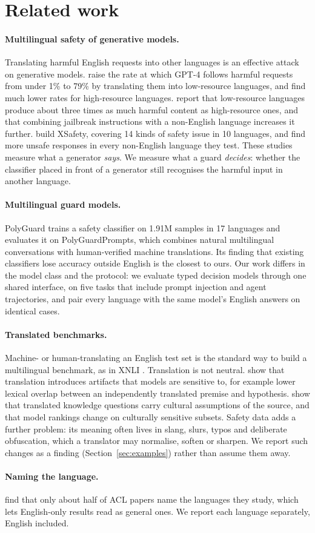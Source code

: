 \section{Related work}
\label{sec:related}

\paragraph{Multilingual safety of generative models.} Translating harmful
English requests into other languages is an effective attack on generative
models. \citet{yong2023lowresource} raise the rate at which GPT-4 follows
harmful requests from under 1\% to 79\% by translating them into low-resource
languages, and find much lower rates for high-resource languages.
\citet{deng2023multilingualjailbreak} report that low-resource languages
produce about three times as much harmful content as high-resource ones, and
that combining jailbreak instructions with a non-English language increases
it further. \citet{wang2023alllanguages} build XSafety, covering 14 kinds of
safety issue in 10 languages, and find more unsafe responses in every non-English
language they test. These studies measure what a generator \emph{says}. We
measure what a guard \emph{decides}: whether the classifier placed in front of a
generator still recognises the harmful input in another language.

\paragraph{Multilingual guard models.} PolyGuard \citep{kumar2025polyguard}
trains a safety classifier on 1.91M samples in 17 languages and evaluates it on
PolyGuardPrompts, which combines natural multilingual conversations with
human-verified machine translations. Its finding that existing classifiers
lose accuracy outside English is the closest to ours. Our work differs in the
model class and the protocol: we evaluate typed decision models through one
shared interface, on five tasks that include prompt injection and agent
trajectories, and pair every language with the same model's English answers on
identical cases.

\paragraph{Translated benchmarks.} Machine- or human-translating an English
test set is the standard way to build a multilingual benchmark, as in XNLI
\citep{conneau2018xnli}. Translation is not neutral.
\citet{artetxe2020translation} show that translation introduces artifacts that
models are sensitive to, for example lower lexical overlap between an
independently translated premise and hypothesis. \citet{singh2025globalmmlu}
show that translated knowledge questions carry cultural assumptions of the
source, and that model rankings change on culturally sensitive subsets. Safety
data adds a further problem: its meaning often lives in slang, slurs, typos and
deliberate obfuscation, which a translator may normalise, soften or sharpen. We
report such changes as a finding (Section~\ref{sec:examples}) rather than
assume them away.

\paragraph{Naming the language.} \citet{ducel2022benderrule} find that only
about half of ACL papers name the languages they study, which lets
English-only results read as general ones. We report each language separately,
English included.
